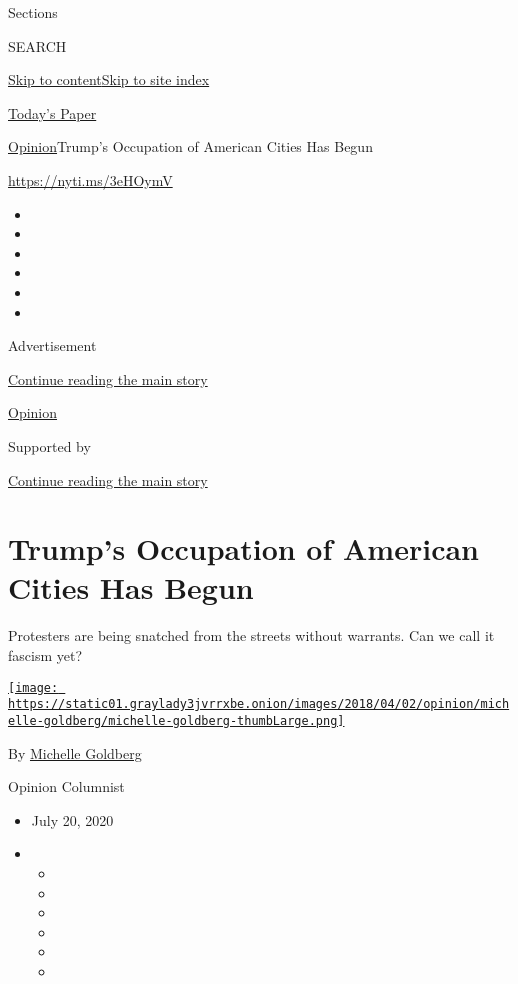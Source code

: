 Sections

SEARCH

\protect\hyperlink{site-content}{Skip to
content}\protect\hyperlink{site-index}{Skip to site index}

\href{https://myaccount.nytimes3xbfgragh.onion/auth/login?response_type=cookie\&client_id=vi}{}

\href{https://www.nytimes3xbfgragh.onion/section/todayspaper}{Today's
Paper}

\href{/section/opinion}{Opinion}\textbar{}Trump's Occupation of American
Cities Has Begun

\url{https://nyti.ms/3eHOymV}

\begin{itemize}
\item
\item
\item
\item
\item
\item
\end{itemize}

Advertisement

\protect\hyperlink{after-top}{Continue reading the main story}

\href{/section/opinion}{Opinion}

Supported by

\protect\hyperlink{after-sponsor}{Continue reading the main story}

\hypertarget{trumps-occupation-of-american-cities-has-begun}{%
\section{Trump's Occupation of American Cities Has
Begun}\label{trumps-occupation-of-american-cities-has-begun}}

Protesters are being snatched from the streets without warrants. Can we
call it fascism yet?

\href{https://www.nytimes3xbfgragh.onion/by/michelle-goldberg}{\texttt{[image: https://static01.graylady3jvrrxbe.onion/images/2018/04/02/opinion/michelle-goldberg/michelle-goldberg-thumbLarge.png]}}

By
\href{https://www.nytimes3xbfgragh.onion/by/michelle-goldberg}{Michelle
Goldberg}

Opinion Columnist

\begin{itemize}
\item
  July 20, 2020
\item
  \begin{itemize}
  \item
  \item
  \item
  \item
  \item
  \item
  \end{itemize}
\end{itemize}

